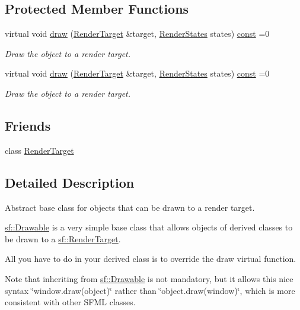 \subsection*{Protected Member Functions}
\begin{DoxyCompactItemize}
\item 
virtual void \hyperlink{classsf_1_1_drawable_a90d2c88bba9b035a0844eccb380ef631}{draw} (\hyperlink{classsf_1_1_render_target}{Render\-Target} \&target, \hyperlink{classsf_1_1_render_states}{Render\-States} states) \hyperlink{term__entry_8h_a57bd63ce7f9a353488880e3de6692d5a}{const} =0
\begin{DoxyCompactList}\small\item\em Draw the object to a render target. \end{DoxyCompactList}\item 
virtual void \hyperlink{classsf_1_1_drawable_a90d2c88bba9b035a0844eccb380ef631}{draw} (\hyperlink{classsf_1_1_render_target}{Render\-Target} \&target, \hyperlink{classsf_1_1_render_states}{Render\-States} states) \hyperlink{term__entry_8h_a57bd63ce7f9a353488880e3de6692d5a}{const} =0
\begin{DoxyCompactList}\small\item\em Draw the object to a render target. \end{DoxyCompactList}\end{DoxyCompactItemize}
\subsection*{Friends}
\begin{DoxyCompactItemize}
\item 
class \hyperlink{classsf_1_1_drawable_a564c389faf3e8638c546c12cdbdda81d}{Render\-Target}
\end{DoxyCompactItemize}


\subsection{Detailed Description}
Abstract base class for objects that can be drawn to a render target. 

\hyperlink{classsf_1_1_drawable}{sf\-::\-Drawable} is a very simple base class that allows objects of derived classes to be drawn to a \hyperlink{classsf_1_1_render_target}{sf\-::\-Render\-Target}.

All you have to do in your derived class is to override the draw virtual function.

Note that inheriting from \hyperlink{classsf_1_1_drawable}{sf\-::\-Drawable} is not mandatory, but it allows this nice syntax \char`\"{}window.\-draw(object)\char`\"{} rather than \char`\"{}object.\-draw(window)\char`\"{}, which is more consistent with other S\-F\-M\-L classes.

